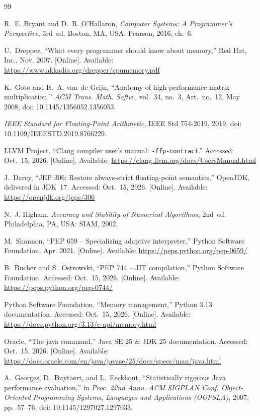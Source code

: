 \documentclass[11pt,a4paper]{article}
\begin{document}
\renewcommand{\refname}{References}
\begin{thebibliography}{99}\raggedright
\small

R.~E. Bryant and D.~R. O'Hallaron, \emph{Computer Systems: A Programmer's
Perspective}, 3rd~ed. Boston, MA, USA: Pearson, 2016, ch.~6.

U.~Drepper, ``What every programmer should know about memory,'' Red Hat, Inc.,
Nov. 2007. [Online]. Available: \url{https://www.akkadia.org/drepper/cpumemory.pdf}

K.~Goto and R.~A. van~de Geijn, ``Anatomy of high-performance matrix
multiplication,'' \emph{ACM Trans. Math. Softw.}, vol.~34, no.~3, Art.~no.~12,
May 2008, doi: 10.1145/1356052.1356053.

\emph{IEEE Standard for Floating-Point Arithmetic}, IEEE Std 754-2019, 2019,
doi: 10.1109/IEEESTD.2019.8766229.

LLVM Project, ``Clang compiler user's manual: \texttt{-ffp-contract}.''
Accessed: Oct.~15, 2026. [Online]. Available:
\url{https://clang.llvm.org/docs/UsersManual.html}

J.~Darcy, ``JEP 306: Restore always-strict floating-point semantics,''
OpenJDK, delivered in JDK~17. Accessed: Oct.~15, 2026. [Online]. Available:
\url{https://openjdk.org/jeps/306}

N.~J. Higham, \emph{Accuracy and Stability of Numerical Algorithms}, 2nd~ed.
Philadelphia, PA, USA: SIAM, 2002.

M.~Shannon, ``PEP 659 -- Specializing adaptive interpreter,'' Python Software
Foundation, Apr. 2021. [Online]. Available: \url{https://peps.python.org/pep-0659/}

B.~Bucher and S.~Ostrowski, ``PEP 744 -- JIT compilation,'' Python Software
Foundation. Accessed: Oct.~15, 2026. [Online]. Available:
\url{https://peps.python.org/pep-0744/}

Python Software Foundation, ``Memory management,'' Python 3.13 documentation.
Accessed: Oct.~15, 2026. [Online]. Available:
\url{https://docs.python.org/3.13/c-api/memory.html}

Oracle, ``The java command,'' Java SE 25 \& JDK 25 documentation. Accessed:
Oct.~15, 2026. [Online]. Available:
\url{https://docs.oracle.com/en/java/javase/25/docs/specs/man/java.html}

A.~Georges, D.~Buytaert, and L.~Eeckhout, ``Statistically rigorous Java
performance evaluation,'' in \emph{Proc. 22nd Annu. ACM SIGPLAN Conf.
Object-Oriented Programming Systems, Languages and Applications (OOPSLA)},
2007, pp.~57--76, doi: 10.1145/1297027.1297033.


\end{thebibliography}
\end{document}
